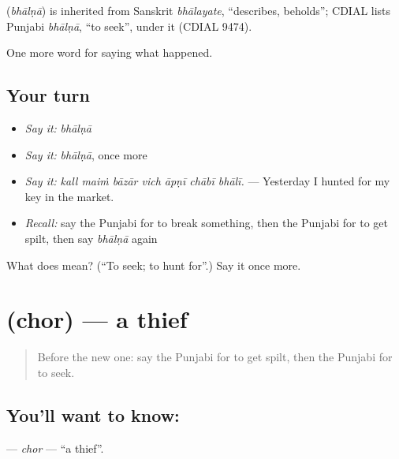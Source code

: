 \begin{cousinweb}
\textbf{} (\emph{bhālṇā}) is inherited from Sanskrit \emph{bhālayate}, \textquotedblleft{}describes, beholds\textquotedblright{}; CDIAL lists Punjabi \emph{bhālṇā}, \textquotedblleft{}to seek\textquotedblright{}, under it (CDIAL 9474).
\end{cousinweb}

\begin{grammarlens}[title={What you've built}]
One more word for saying what happened.
\end{grammarlens}

\subsection*{Your turn}
\begin{itemize}
\raggedright
  \item \emph{Say it:} \emph{bhālṇā}
  \item \emph{Say it:} \emph{bhālṇā}, once more
  \item \emph{Say it:} \emph{kall maiṁ bāzār vich āpṇī chābī bhālī.} — Yesterday I hunted for my key in the market.
  \item \emph{Recall:} say the Punjabi for to break something, then the Punjabi for to get spilt, then say \emph{bhālṇā} again
\end{itemize}

\begin{tcolorbox}[breakable,colback=teal!4,colframe=teal!35!black,title={Before you move on}]
What does  mean? (\textquotedblleft{}To seek; to hunt for\textquotedblright{}.) Say it once more.
\end{tcolorbox}
\section[\texorpdfstring{\pa{ਚੋਰ} (chor)}{ਚੋਰ (chor)}]{ (chor) — a thief}

\label{lesson:PA-C311-chor}



\begin{quote}
Before the new one: say the Punjabi for to get spilt, then the Punjabi for to seek.
\end{quote}

\subsection*{You'll want to know: }
\textbf{} — \emph{chor} — \textquotedblleft{}a thief\textquotedblright{}.

